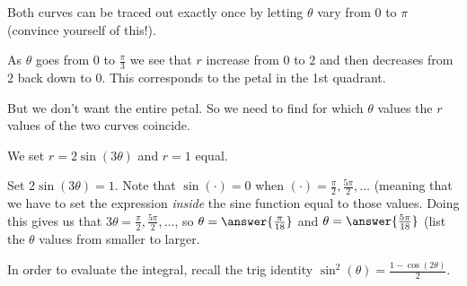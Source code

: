 \documentclass{ximera}
\begin{document}
\begin{exercise}
\begin{hint}
Both curves can be traced out exactly once by letting $\theta$ vary from $0$ to $\pi$ (convince yourself of this!).

As $\theta$ goes from $0$ to $\frac{\pi}{3}$ we see that $r$ increase from $0$ to $2$ and then decreases from $2$ back down to $0$. This corresponds to the petal in the 1st quadrant. 

But we don't want the entire petal. So we need to find for which $\theta$ values the $r$ values of the two curves coincide. 

We set $r=2\sin(3\theta)$ and $r=1$ equal. 

Set $2\sin(3\theta)=1$.  Note that $\sin(\cdot) = 0$ when $(\cdot) = \frac{\pi}{2},\frac{5\pi}{2}, \ldots$  (meaning that we have to set the expression \emph{inside} the sine function equal to those values.  Doing this gives us that $3 \theta = \frac{\pi}{2},\frac{5\pi}{2}, \ldots$, so $\theta=\answer{\frac{\pi}{18}}$ and $\theta=\answer{\frac{5\pi}{18}}$ (list the $\theta$ values from smaller to larger. 


In order to evaluate the integral, recall the trig identity $\sin^2(\theta)=\frac{1-\cos(2\theta)}{2}$. 










\end{hint}

\end{exercise}
\end{document}
